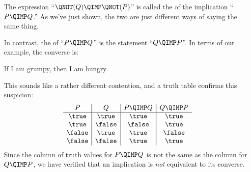 The expression ``$\QNOT(Q) \QIMP \QNOT(P)$'' is called the
 of the implication ``$P \QIMP Q$.''  As we've
just shown, the two are just different ways of saying the same thing.

In contrast, the  of ``$P \QIMP Q$'' is the statement
``$Q \QIMP P$''.  In terms of our example, the converse is:
%
\begin{center}
If I am grumpy, then I am hungry.
\end{center}
%
This sounds like a rather different contention, and a truth table
confirms this suspicion:
%
\[
\begin{array}{c|c|c|c}
P & Q &
    P \QIMP Q &
    Q \QIMP P \\ \hline
\true & \true & \true & \true \\
\true & \false & \false & \true \\
\false & \true & \true & \false \\
\false & \false & \true & \true
\end{array}
\]
%
 Since the column of truth values for $P
\QIMP Q$ is not the same as the column for $Q \QIMP P$, we have verified
that an implication is \emph{not} equivalent to its converse.

